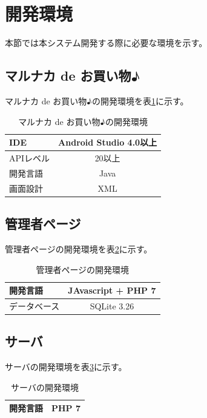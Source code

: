 \documentclass[a4j]{jarticle}
\begin{document}
\section{開発環境}
本節では本システム開発する際に必要な環境を示す。

\subsection{マルナカ de お買い物♪}
マルナカ de お買い物♪の開発環境を表\ref{Kmarunaka}に示す。
\begin{table}[h]
  \begin{center}
    \caption{マルナカ de お買い物♪の開発環境}
    \begin{tabular}{|l|c|}\hline
      IDE&Android Studio 4.0以上\\ \hline
      APIレベル&20以上\\ \hline
      開発言語&Java\\ \hline
      画面設計&XML\\ \hline

    \end{tabular}
    \label{Kmarunaka}
  \end{center}
\end{table}

\subsection{管理者ページ}
管理者ページの開発環境を表\ref{Kmaster}に示す。
\begin{table}[h]
  \begin{center}
    \caption{管理者ページの開発環境}
    \begin{tabular}{|l|c|}\hline
      開発言語&JAvascript + PHP 7\\ \hline
      データベース&SQLite 3.26\\ \hline
    \end{tabular}
    \label{Kmaster}
  \end{center}
\end{table}

\subsection{サーバ}
サーバの開発環境を表\ref{Ksaba}に示す。
\begin{table}[h]
  \begin{center}
    \caption{サーバの開発環境}
    \begin{tabular}{|l|c|}\hline
      開発言語&PHP 7\\ \hline
    \end{tabular}
    \label{Ksaba}
  \end{center}
\end{table}
\end{document}
